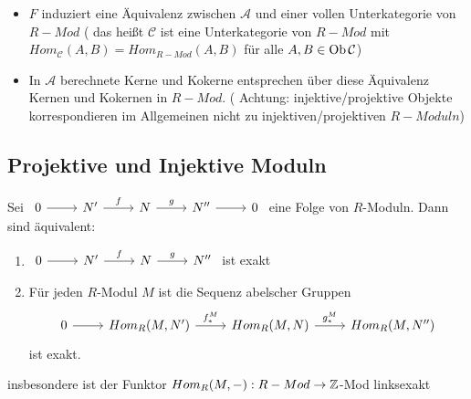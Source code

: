 \begin{anm}
	\begin{itemize}
		\item $F$ induziert eine Äquivalenz zwischen $\mathcal{A}$ und einer vollen Unterkategorie von $R-Mod $ ( das heißt $\mathcal{C} $ ist eine Unterkategorie von $R-Mod $ mit $ Hom_{\mathcal{C}}(A,B)= Hom_{R-Mod}(A,B) $ für alle $ A,B \in \text{Ob}\,\mathcal{C}$)
		\item In $\mathcal{A} $ berechnete Kerne und Kokerne entsprechen über diese Äquivalenz Kernen und Kokernen in $R-Mod$. ( Achtung: injektive/projektive Objekte korrespondieren im Allgemeinen nicht zu injektiven/projektiven $R-Moduln$)
	\end{itemize}
\end{anm}
\newpage 
\subsection{Projektive und Injektive Moduln}
\begin{sa}
	Sei $\begin{tikzcd}
	0  \arrow{r} & N' \arrow{r}{f} & N \arrow{r}{g} & N'' \arrow{r} & 0
	\end{tikzcd} $ eine Folge von $R$-Moduln. Dann sind äquivalent: 
	\begin{enumerate} [label= \roman*)]
		\item $\begin{tikzcd}
		0  \arrow{r} & N' \arrow{r}{f} & N \arrow{r}{g} & N'' 
		\end{tikzcd} $ ist exakt
		\item Für jeden $R$-Modul $M$ ist die Sequenz abelscher Gruppen  $$\begin{tikzcd}
		0  \arrow{r} & Hom_{R}(M,N') \arrow{r}{f_{*}^{M}} & Hom_{R}(M,N)  \arrow{r}{g_{*}^{M}} & Hom_{R}(M,N'') 
		\end{tikzcd} $$ ist exakt.
	\end{enumerate}
	insbesondere ist der Funktor $Hom_R(M,-): R-Mod \to \mathbb{Z}$-Mod linksexakt
\end{sa}
